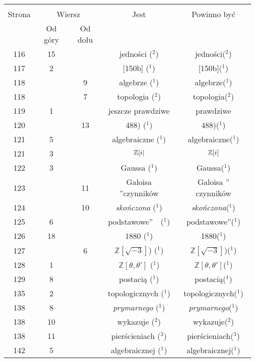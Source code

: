 \documentclass[a4paper,11pt]{article}
\begin{document}
\begin{center}
  \begin{tabular}{|c|c|c|c|c|}
    \hline
    & \multicolumn{2}{c|}{} & & \\
    Strona & \multicolumn{2}{c|}{Wiersz} & Jest
                              & Powinno być \\ \cline{2-3}
    & Od góry & Od dołu & & \\
    \hline
    116 & 15 & & jedności ($^{ 2 }$) & jedności($^{ 2 }$) \\
    117 &  2 & & [150b] ($^{ 1 }$) & [150b]($^{ 1 }$) \\
    118 & &  9 & algebrze ($^{ 1 }$) & algebrze($^{ 1 }$) \\
    118 & &  7 & topologia ($^{ 2 }$) & topologia($^{ 2 }$) \\
    119 &  1 & & jeszcze prawdziwe & prawdziwe \\
    120 & & 13 & 488) ($^{ 1 }$) & 488)($^{ 1 }$) \\
    121 &  5 & & algebraiczne ($^{ 1 }$) & algebraiczne($^{ 1 }$) \\
    121 &  3 & & $\mathbb{Z}[ i |$ & $\mathbb{Z}[ i ]$ \\
    122 &  3 & & Gaussa ($^{ 1 }$) & Gaussa($^{ 1 }$) \\
    123 & & 11 & Galoisa ”czynników  & Galoisa ” czynników \\
    124 & & 10 & \textit{skończona} ($^{ 1 }$)
           & \textit{skończona}($^{ 1 }$) \\
    125 &  6 & & podstawowe”~~($^{ 1 }$) & podstawowe”($^{ 1 }$) \\
    126 & 18 & & 1880 ($^{ 1 }$) & 1880($^{ 1 }$) \\
    127 & &  6 & $\mathbb{Z}[ \sqrt{ -3 } ]$) ($^{ 1 }$)
           & $\mathbb{Z}[ \sqrt{ -3 } ]$)($^{ 1 }$) \\
    128 &  1 & & $\mathbb{Z}[ \theta, \theta' ]$ ($^{ 1 }$)
           & $\mathbb{Z}[ \theta, \theta' ]$($^{ 1 }$) \\
    129 &  8 & & postacią ($^{ 1 }$) & postacią($^{ 1 }$) \\
    135 &  2 & & topologicznych ($^{ 1 }$) & topologicznych($^{ 1 }$) \\
    138 &  8 & & \textit{prymarnego} ($^{ 1 }$)
           & \textit{prymarnego}($^{ 1 }$) \\
    138 & 10 & & wykazuje ($^{ 2 }$) & wykazuje($^{ 2 }$) \\
    138 & 11 & & pierścieniach ($^{ 3 }$) & pierścieniach($^{ 3 }$) \\
    142 &  5 & & algebraicznej ($^{ 1 }$) & algebraicznej($^{ 1 }$) \\

\end{tabular}
\end{center}
\end{document}
